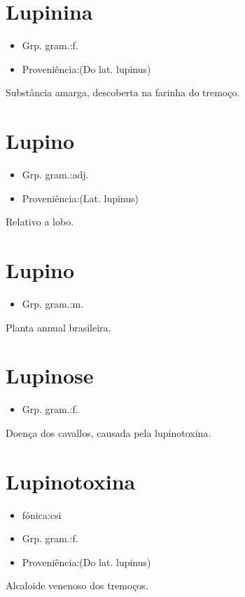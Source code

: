 \section{Lupinina}
\begin{itemize}
\item {Grp. gram.:f.}
\end{itemize}
\begin{itemize}
\item {Proveniência:(Do lat. \textunderscore lupinus\textunderscore )}
\end{itemize}
Substância amarga, descoberta na farinha do tremoço.
\section{Lupino}
\begin{itemize}
\item {Grp. gram.:adj.}
\end{itemize}
\begin{itemize}
\item {Proveniência:(Lat. \textunderscore lupinus\textunderscore )}
\end{itemize}
Relativo a lobo.
\section{Lupino}
\begin{itemize}
\item {Grp. gram.:m.}
\end{itemize}
Planta annual brasileira.
\section{Lupinose}
\begin{itemize}
\item {Grp. gram.:f.}
\end{itemize}
Doença dos cavallos, causada pela lupinotoxina.
\section{Lupinotoxina}
\begin{itemize}
\item {fónica:csi}
\end{itemize}
\begin{itemize}
\item {Grp. gram.:f.}
\end{itemize}
\begin{itemize}
\item {Proveniência:(Do lat. \textunderscore lupinus\textunderscore )}
\end{itemize}
Alcaloide venenoso dos tremoços.
